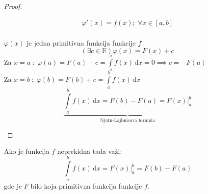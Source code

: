 \begin{proof}
\begin{enumerate}[label = \arabic*)]
\begin{gather*}
				\varphi'(x) = f(x); \; \forall x \in [a,b]\\
			\end{gather*}
			\begin{corollary}
				$\varphi(x)$ je jedna primitivna funkcija funkcije $f$
				$$(\exists c \in \mathbb{R}) \varphi (x) = F(x) +c$$
				Za $x=a\; : \;\varphi(a) = F(a)+c = \int \limits^a_a f(x) \, \mathrm{d} x = 0 \implies c = -F(a)$\\
				Za $x=b\; : \;\varphi(b) = F(b)+c = \int \limits^b_a f(x)\, \mathrm{d}x$
				$$\underbrace{\int \limits^b_a f(x) \, \mathrm{d} x = F(b)-F(a) = F(x)|^b_a}_{\text{Njutn-Lajbnicova formula}}$$
			\end{corollary}
	\end{enumerate}
\end{proof}
\begin{theorem}
	Ako je funkcija $f$ neprekidna tada važi:
	$$\int \limits^b_a f(x) \, \mathrm{d} x = F(x)|^b_a = F(b)-F(a)$$ gde je $F$ bilo koja primitivna funkcija funkcije $f$.
\end{theorem}

